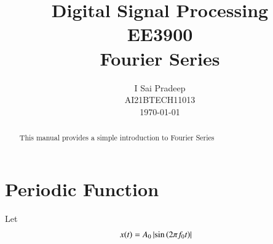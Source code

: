 \documentclass[journal,12pt,twocolumn]{IEEEtran}
\begin{document}
	\title{ Digital Signal Processing \\ \Large EE3900 \\ \vspace*{12pt} \textbf{Fourier Series}}
	\author{I Sai Pradeep\\ \normalsize AI21BTECH11013 \\ \vspace*{20pt} \normalsize \today}
	\maketitle 
	\tableofcontents
	\begin{abstract}
		This manual provides a simple introduction to Fourier Series
	\end{abstract}
	\section{Periodic Function}
	Let 
	\begin{align}
		x(t) &= A_0\left\vert\sin\left(2\pi f_0 t\right)\right\vert
		\label{eq:x(t)}
	\end{align}
\end{document}
